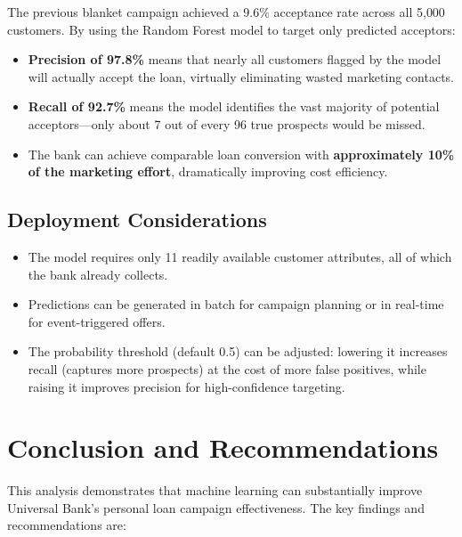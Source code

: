 \documentclass[11pt, a4paper]{article}
\begin{document}
The previous blanket campaign achieved a 9.6\% acceptance rate across all
5{,}000 customers. By using the Random Forest model to target only predicted
acceptors:

\begin{itemize}[itemsep=2pt]
    \item \textbf{Precision of 97.8\%} means that nearly all customers flagged
          by the model will actually accept the loan, virtually eliminating
          wasted marketing contacts.
    \item \textbf{Recall of 92.7\%} means the model identifies the vast
          majority of potential acceptors---only about 7 out of every 96 true
          prospects would be missed.
    \item The bank can achieve comparable loan conversion with
          \textbf{approximately 10\% of the marketing effort}, dramatically
          improving cost efficiency.
\end{itemize}

\subsection{Deployment Considerations}

\begin{itemize}[itemsep=2pt]
    \item The model requires only 11 readily available customer attributes,
          all of which the bank already collects.
    \item Predictions can be generated in batch for campaign planning or in
          real-time for event-triggered offers.
    \item The probability threshold (default 0.5) can be adjusted: lowering it
          increases recall (captures more prospects) at the cost of more false
          positives, while raising it improves precision for high-confidence
          targeting.
\end{itemize}

\section{Conclusion and Recommendations}

This analysis demonstrates that machine learning can substantially improve
Universal Bank's personal loan campaign effectiveness. The key findings and
recommendations are:
\end{document}
